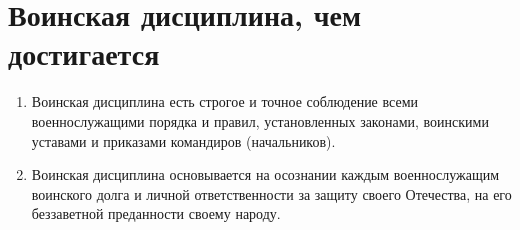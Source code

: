 \documentclass[12pt,a4paper]{report}
\begin{document}
\section{Воинская дисциплина, чем достигается }
\begin{enumerate}

\item Воинская  дисциплина  есть  строгое  и  точное  соблюдение  всеми  военнослужащими  порядка  и правил,  установленных  законами,  воинскими  уставами  и  приказами  командиров (начальников).

\item Воинская  дисциплина  основывается  на  осознании  каждым  военнослужащим  воинского  долга  и  личной  ответственности  за  защиту  своего  Отечества,  на  его  беззаветной  преданности  своему  народу.


\end{enumerate}
\end{document}
